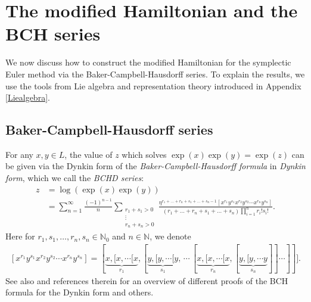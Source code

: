 \documentclass[11pt]{article}
\newcommand{\N}{\mathbb{N}}
\begin{document}
\section{The modified Hamiltonian and the BCH series}\label{Section_BCH}

We now discuss how to construct the modified Hamiltonian for the symplectic Euler method via the Baker-Campbell-Hausdorff series. 
To explain the results, we use the tools from Lie algebra and representation theory introduced in Appendix \ref{Liealgebra}.

\subsection{Baker-Campbell-Hausdorff series}

For any $x,y\in L$, the value of $z$ which solves $\exp\left(x\right)\exp\left(y\right)=\exp\left(z\right)$ can be given via the Dynkin form of the \textit{Baker-Campbell-Hausdorff formula} \citep{Jacobson1979} in {\em Dynkin form}, which we call the {\it BCHD series}:
\begin{align}
    z&=\log\left(\exp\left(x\right)\exp\left(y\right)\right)\\
    &=\sum_{n=1}^{\infty}{\frac{\left(-1\right)^{n-1}}{n}{\sum_{\substack{ r_{1}+s_{1}>0 \\ \vdots \\ r_{n}+s_{n}>0}}{\frac{\eta^{r_{1}+\dots+r_{n}+s_{1}+\dots+s_{n}-1}\left[x^{r_{1}}y^{s_{1}}x^{r_{2}}y^{s_{2}}\cdots x^{r_{n}}y^{s_{n}}\right]}{\left(r_{1}+\dots+r_{n}+s_{1}+\dots+s_{n}\right)\prod_{i=1}^{n}{r_{i}!s_{i}!}}}}}.\label{predynkin}
\end{align}
Here for $r_1,s_1,\dots,r_n,s_n \in \N_0$ and $n \in \N$, we denote
\begin{gather}
    \left[x^{r_{1}}y^{s_{1}}x^{r_{2}}y^{s_{2}}\cdots x^{r_{n}}y^{s_{n}}\right]=[\underbrace {x,[x,\dotsm [x} _{r_{1}},[\underbrace {y,[y,\dotsm [y} _{s_{1}},\,\dotsm \,[\underbrace {x,[x,\dotsm [x} _{r_{n}},[\underbrace {y,[y,\dotsm y} _{s_{n}}]]\dotsm ]]].\nonumber
\end{gather}
See also \cite{Achilles2012} and references therein for an overview of different proofs of the BCH formula for the Dynkin form and others.
\end{document}
